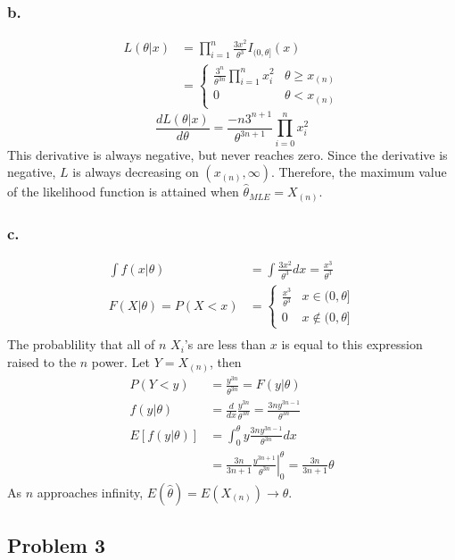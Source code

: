 \documentclass{article}
\begin{document}
\subsubsection*{b.}
\begin{align*}
L(\theta|x) &= \prod_{i=1}^n\frac{3x^2}{\theta^3}I_{(0,\theta]}(x) \\
&=\begin{cases} \frac{3^n}{\theta^{3n}}\prod_{i=1}^n x_i^2 & \theta \geq x_{(n)} \\ 0 & \theta < x_{(n)} \end{cases}
\end{align*}
\[\frac{dL(\theta|x)}{d\theta} = \frac{-n3^{n+1}}{\theta^{3n+1}}\prod_{i=0}^n x_i^2\]
This derivative is always negative, but never reaches zero. Since the derivative is negative, $L$ is always decreasing on $(x_{(n)}, \infty)$. Therefore, the maximum value of the likelihood function is attained when $\hat{\theta}_{MLE} = X_{(n)}$.
\subsubsection*{c.}
\begin{align*}
\int f(x|\theta) &= \int \frac{3x^2}{\theta^3}dx = \frac{x^3}{\theta^3}\\
F(X|\theta)= P(X < x)&= \begin{cases}\frac{x^3}{\theta^3} &x \in (0,\theta] \\ 0 & x \notin (0,\theta]\end{cases}  \\
\end{align*}
The probablility that all of $n$ $X_i$'s are less than $x$ is equal to this expression raised to the $n$ power. Let $Y = X_{(n)}$, then 
\begin{align*}
P(Y < y) &= \frac{y^{3n}}{\theta^{3n}} = F(y|\theta) \\
f(y|\theta) &= \frac{d}{dx}\frac{y^{3n}}{\theta^{3n}} = \frac{3ny^{3n-1}}{\theta^{3n}} \\
E\left[f(y|\theta)\right] &= \int_0^\theta y\frac{3ny^{3n-1}}{\theta^{3n}}dx \\
&= \frac{3n}{3n+1}\left.\frac{y^{3n+1}}{\theta^{3n}}\right|^\theta_0 = \frac{3n}{3n+1}\theta
\end{align*}
As $n$ approaches infinity, $E(\hat{\theta}) = E(X_{(n)}) \to \theta$. 

\subsection*{Problem 3}
\end{document}
